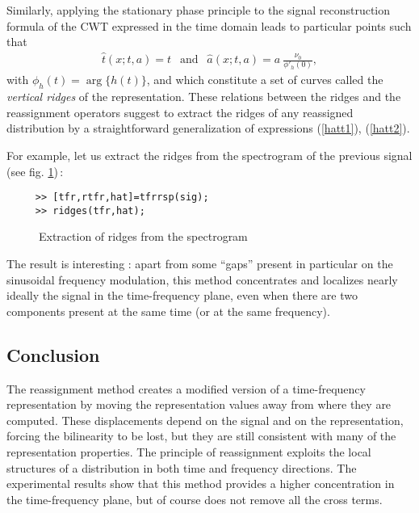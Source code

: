 Similarly, applying the stationary phase principle to the signal
reconstruction formula of the CWT expressed in the time domain leads to
particular points such that
\begin{eqnarray}
\label{hatt2}
\hat{t}(x;t,a)=t\ \ \mbox{ and }\ \ \hat{a}(x;t,a)=a\
\frac{\nu_0}{\phi'_h(0)},  
\end{eqnarray}
with $\phi_h(t)=\arg\{h(t)\}$, and which constitute a set of curves called
the {\it vertical ridges} of the representation. These relations between
the ridges and the reassignment operators suggest to extract the ridges of
any reassigned distribution by a straightforward generalization of
expressions (\ref{hatt1}), (\ref{hatt2}).

For example, let us extract the ridges from the spectrogram of the previous
signal (see fig. \ref{Re1fig6})\,:\index{\ttfamily ridges}
\begin{verbatim}
     >> [tfr,rtfr,hat]=tfrrsp(sig); 
     >> ridges(tfr,hat);
\end{verbatim}
\begin{figure}[htb]
\epsfxsize=10cm
\epsfysize=10cm
\centerline{}
\caption{\label{Re1fig6}Extraction of ridges from the spectrogram} 
\end{figure}
The result is interesting : apart from some ``gaps'' present in particular
on the sinusoidal frequency modulation, this method concentrates and
localizes nearly ideally the signal in the time-frequency plane, even when
there are two components present at the same time (or at the same
frequency).


\subsection{Conclusion}

  The reassignment method creates a modified version of a
time-frequency representation by moving the representation values away
from where they are computed. These displacements depend on the signal
and on the representation, forcing the bilinearity to be lost, but
they are still consistent with many of the representation
properties. The principle of reassignment exploits the local
structures of a distribution in both time and frequency
directions. The experimental results show that this method provides a
higher concentration in the time-frequency plane, but of course does
not remove all the cross terms.
